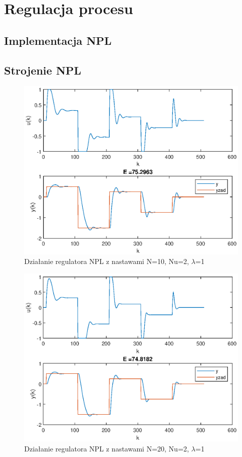 \chapter{Regulacja procesu}
	\label{ch:reg}
	
	\section{Implementacja NPL}
		\label{sec:NPL}
		
	\section{Strojenie NPL}
		\label{sec:stroj_NPL}
		
		\begin{figure}[h!]
			\centering
			\includegraphics[width=\linewidth]{img/strojenieNPL_N_10_Nu_2_lam_1.eps}
			\caption{Działanie regulatora NPL z nastawami N=10, Nu=2, $\lambda$=1}
			\label{fig:NPL0}
		\end{figure}
		
		\begin{figure}[h!]
			\centering
			\includegraphics[width=\linewidth]{img/NPLN20.eps}
			\caption{Działanie regulatora NPL z nastawami N=20, Nu=2, $\lambda$=1}
			\label{fig:NPL1}
		\end{figure}
		
